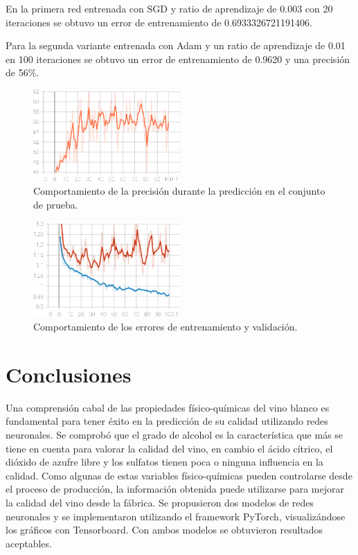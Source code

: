 \documentclass[runningheads]{llncs}
\begin{document}
En la primera red entrenada con SGD y ratio de aprendizaje de 0.003 con 20 iteraciones se obtuvo un error de entrenamiento de 0.6933326721191406.

Para la segunda variante entrenada con Adam y un ratio de aprendizaje de 0.01 en 100 iteraciones se obtuvo un error de entrenamiento de 0.9620 y una precisi{\'o}n de 56\%.

\begin{figure}[htbp]
	\centering
	\includegraphics[width=0.5\textwidth]{images/Accuracy.eps}
	\caption{Comportamiento de la precisi{\'o}n durante la predicci{\'o}n en el conjunto de prueba.}
	\label{accuracy}
\end{figure}

\begin{figure}[htbp]
	\centering
	\includegraphics[width=0.5\textwidth]{images/LOSS.eps}
	\caption{Comportamiento de los errores de entrenamiento y validaci{\'o}n.}
	\label{loss}
\end{figure}  

\section{Conclusiones}
Una comprensi{\'o}n cabal de las propiedades f{\'i}sico-qu{\'i}micas del vino blanco es fundamental para tener {\'e}xito en la predicci{\'o}n de su calidad utilizando redes neuronales. Se comprob{\'o} que el grado de alcohol es la caracter{\'i}stica que m{\'a}s se tiene en cuenta para valorar la calidad del vino, en cambio el {\'a}cido c{\'i}trico, el di{\'o}xido de azufre libre y los sulfatos tienen poca o ninguna influencia en la calidad. Como algunas de estas variables f{\'i}sico-qu{\'i}micas pueden controlarse desde el proceso de producci{\'o}n,  la informaci{\'o}n obtenida puede utilizarse para mejorar la calidad del vino desde la f{\'a}brica. Se propusieron dos modelos de redes neuronales y se implementaron utilizando el framework PyTorch, visualiz{\'a}ndose los gr{\'a}ficos con Tensorboard. Con ambos modelos se obtuvieron resultados aceptables. 

%
%
%


%
\end{document}
